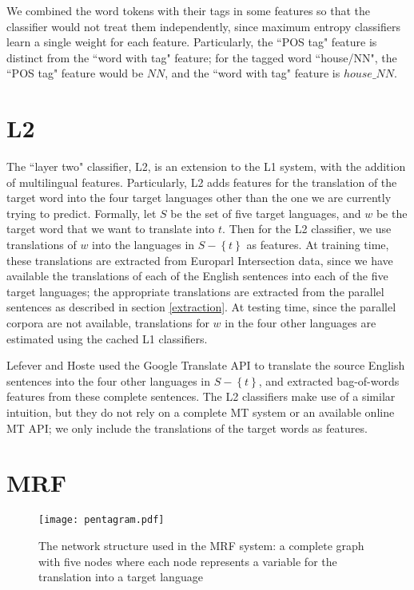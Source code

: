 \documentclass[11pt,letterpaper]{article}
\begin{document}
We combined the word tokens with their tags in some features so that the
classifier would not treat them independently, since maximum entropy
classifiers learn a single weight for each feature.
Particularly, the ``POS tag" feature is distinct from the ``word with tag"
feature; for the tagged word ``house/NN", the ``POS tag" feature would be $NN$,
and the ``word with tag" feature is $house\_NN$. 

\section{L2}
The ``layer two" classifier, L2, is an extension to the L1 system, with the
addition of multilingual features. Particularly, L2 adds features for the
translation of the target word into the four target languages other than the
one we are currently trying to predict. Formally, let $S$ be the set of five
target languages, and $w$ be the target word that we want to translate into
$t$. Then for the L2 classifier, we use translations of $w$ into the languages
in $S - \left\lbrace t \right\rbrace$ as features. At training time, these
translations are extracted from Europarl Intersection data, since we have
available the translations of each of the English sentences into each of the
five target languages; the appropriate translations are extracted from the
parallel sentences as described in section \ref{extraction}. At testing time,
since the parallel corpora are not available, translations for $w$ in the four
other languages are estimated using the cached L1 classifiers.

Lefever and Hoste  used the
Google Translate API to translate the source English sentences into the four
other languages in $S - \left\lbrace t \right\rbrace$, and extracted
bag-of-words features from these complete sentences. The L2 classifiers make
use of a similar intuition, but they do not rely on a complete MT system or an
available online MT API; we only include the translations of the target words
as features.

\section{MRF}
\begin{figure}
  \begin{center}
  \texttt{[image: pentagram.pdf]}
  \end{center}
  \caption{The network structure used in the MRF system: a complete graph with
    five nodes where each node represents a variable for the translation into a
    target language}
  \label{fig:pentagram}
\end{figure}
\end{document}
